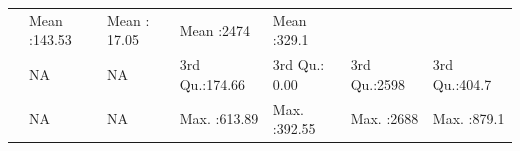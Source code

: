 \documentclass[]{article}
\begin{document}
\begin{longtable}[]{@{}lllllll@{}}
\begin{minipage}[t]{0.15\columnwidth}
\end{minipage} & \begin{minipage}[t]{0.13\columnwidth}\raggedright\strut
Mean :143.53\strut
\end{minipage} & \begin{minipage}[t]{0.13\columnwidth}\raggedright\strut
Mean : 17.05\strut
\end{minipage} & \begin{minipage}[t]{0.11\columnwidth}\raggedright\strut
Mean :2474\strut
\end{minipage} & \begin{minipage}[t]{0.12\columnwidth}\raggedright\strut
Mean :329.1\strut
\end{minipage}\tabularnewline
\begin{minipage}[t]{0.03\columnwidth}\raggedright\strut
\strut
\end{minipage} & \begin{minipage}[t]{0.14\columnwidth}\raggedright\strut
NA\strut
\end{minipage} & \begin{minipage}[t]{0.15\columnwidth}\raggedright\strut
NA\strut
\end{minipage} & \begin{minipage}[t]{0.13\columnwidth}\raggedright\strut
3rd Qu.:174.66\strut
\end{minipage} & \begin{minipage}[t]{0.13\columnwidth}\raggedright\strut
3rd Qu.: 0.00\strut
\end{minipage} & \begin{minipage}[t]{0.11\columnwidth}\raggedright\strut
3rd Qu.:2598\strut
\end{minipage} & \begin{minipage}[t]{0.12\columnwidth}\raggedright\strut
3rd Qu.:404.7\strut
\end{minipage}\tabularnewline
\begin{minipage}[t]{0.03\columnwidth}\raggedright\strut
\strut
\end{minipage} & \begin{minipage}[t]{0.14\columnwidth}\raggedright\strut
NA\strut
\end{minipage} & \begin{minipage}[t]{0.15\columnwidth}\raggedright\strut
NA\strut
\end{minipage} & \begin{minipage}[t]{0.13\columnwidth}\raggedright\strut
Max. :613.89\strut
\end{minipage} & \begin{minipage}[t]{0.13\columnwidth}\raggedright\strut
Max. :392.55\strut
\end{minipage} & \begin{minipage}[t]{0.11\columnwidth}\raggedright\strut
Max. :2688\strut
\end{minipage} & \begin{minipage}[t]{0.12\columnwidth}\raggedright\strut
Max. :879.1\strut
\end{minipage}\tabularnewline
\bottomrule
\end{longtable}
\end{document}
